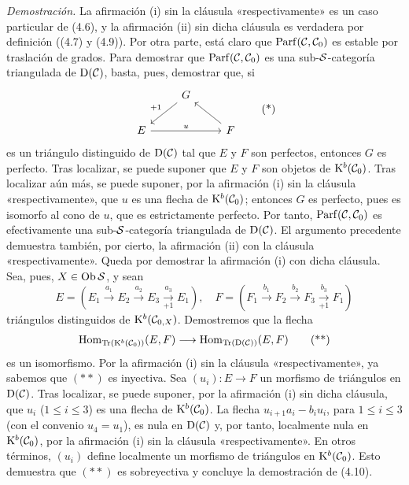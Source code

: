 \emph{Demostración.} La afirmación (i) sin la cláusula «respectivamente» es un caso particular de (4.6), y la afirmación (ii) sin dicha cláusula es verdadera por definición ((4.7) y (4.9)). Por otra parte, está claro que \(\Parf(\mathcal C,\mathcal C_0)\) es estable por traslación de grados. Para demostrar que \(\Parf(\mathcal C,\mathcal C_0)\) es una sub-\(\sisi{S}{\mathcal S}\)-categoría triangulada de \(\Dpx(\mathcal C)\), basta, pues, demostrar que, si
\[
\begin{tikzcd}
& G \arrow[dl,"+1"'] & \\
E \arrow[rr,"u"] && F \arrow[ul]
\end{tikzcd}
\tag{*}
\]
es un triángulo distinguido de \(\Dpx(\mathcal C)\) tal que \(E\) y \(F\) son perfectos, entonces \(G\) es perfecto. Tras localizar, se puede suponer que \(E\) y \(F\) son objetos de \(\Kpx^b(\mathcal C_0)\). Tras localizar aún más, se puede suponer, por la afirmación (i) sin la cláusula «respectivamente», que \(u\) es una flecha de \(\Kpx^b(\mathcal C_0)\); entonces \(G\) es perfecto, pues es isomorfo al cono de \(u\), que es estrictamente perfecto. Por tanto, \(\Parf(\mathcal C,\mathcal C_0)\) es efectivamente una sub-\(\sisi{S}{\mathcal S}\)-categoría triangulada de \(\Dpx(\mathcal C)\). El argumento precedente demuestra también, por cierto, la afirmación (ii) con la cláusula «respectivamente». Queda por demostrar la afirmación (i) con dicha cláusula. Sea, pues, \(X\in\Ob \sisi{S}{\mathcal S}\), y sean
\[
E=(E_1\xrightarrow{a_1}E_2\xrightarrow{a_2}E_3\xrightarrow[+1]{a_3}E_1),
\quad
F=(F_1\xrightarrow{b_1}F_2\xrightarrow{b_2}F_3\xrightarrow[+1]{b_3}F_1)
\]
triángulos distinguidos de \(\Kpx^b(\mathcal C_{0,X})\). Demostremos que la flecha
\[
  \Hom_{\Tr(\Kpx^b(\mathcal C_0))}(E,F)
  \longrightarrow
  \Hom_{\Tr(\Dpx(\mathcal C))}(E,F)
  \tag{**}
\]
es un isomorfismo. Por la afirmación (i) sin la cláusula «respectivamente», ya sabemos que \((**)\) es inyectiva. Sea \((u_i):E\to F\) un morfismo de triángulos en \(\Dpx(\mathcal C)\). Tras localizar, se puede suponer, por la afirmación (i) sin dicha cláusula, que \(u_i\) (\(1\leq i\leq3\)) es una flecha de \(\Kpx^b(\mathcal C_0)\). La flecha \(u_{i+1}a_i-b_iu_i\), para \(1\leq i\leq3\) (con el convenio \(u_4=u_1\)), es nula en \(\Dpx(\mathcal C)\) y, por tanto, localmente nula en \(\Kpx^b(\mathcal C_0)\), por la afirmación (i) sin la cláusula «respectivamente». En otros términos, \((u_i)\) define localmente un morfismo de triángulos en \(\Kpx^b(\mathcal C_0)\). Esto demuestra que \((**)\) es sobreyectiva y concluye la demostración de (4.10).

